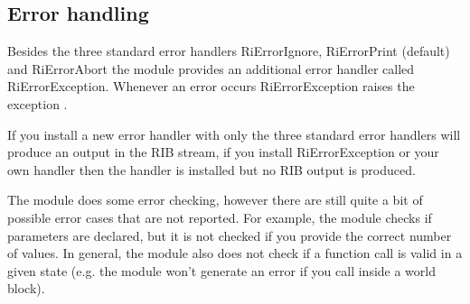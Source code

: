 \subsection{Error handling}

Besides the three standard error handlers RiErrorIgnore, RiErrorPrint
(default) and RiErrorAbort the module provides an additional error
handler called RiErrorException. Whenever an error occurs
RiErrorException raises the exception .

If you install a new error handler with 
only the three standard error handlers will produce an output in the
RIB stream, if you install RiErrorException or your own handler then
the handler is installed but no RIB output is produced.

The module does some error checking, however there are still quite a
bit of possible error cases that are not reported. For example, the
module checks if parameters are declared, but it is not checked if you
provide the correct number of values. In general, the module also does
not check if a function call is valid in a given state (e.g. the
module won't generate an error if you call 
inside a world block).


